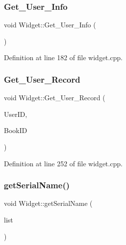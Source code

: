 \mbox{\label{class_widget_a349b456bf6a673058ef7449e44866e90}} 
\subsubsection{\texorpdfstring{Get\_User\_Info}{Get\_User\_Info}}
{\footnotesize\ttfamily void Widget\+::\+Get\+\_\+\+User\+\_\+\+Info (\begin{DoxyParamCaption}{ }\end{DoxyParamCaption})\hspace{0.3cm}{\ttfamily [slot]}}



Definition at line 182 of file widget.\+cpp.

\mbox{\label{class_widget_a743bf0399f3c3972556443c2576386be}} 
\subsubsection{\texorpdfstring{Get\_User\_Record}{Get\_User\_Record}}
{\footnotesize\ttfamily void Widget\+::\+Get\+\_\+\+User\+\_\+\+Record (\begin{DoxyParamCaption}\item[{Q\+String}]{User\+ID,  }\item[{Q\+String}]{Book\+ID }\end{DoxyParamCaption})\hspace{0.3cm}{\ttfamily [slot]}}



Definition at line 252 of file widget.\+cpp.

\mbox{\label{class_widget_afb97de9294ffdbb2c64ed1f96aea9261}} 
\subsubsection{\texorpdfstring{getSerialName()}{getSerialName()}}
{\footnotesize\ttfamily void Widget\+::get\+Serial\+Name (\begin{DoxyParamCaption}\item[{Q\+String\+List $\ast$}]{list }\end{DoxyParamCaption})}



